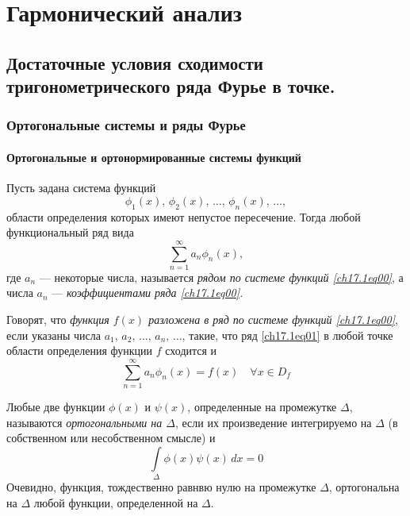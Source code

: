 \part[Гармонический анализ]{Гармонический анализ}%

\chapter{Достаточные условия сходимости тригонометрического ряда Фурье в точке.}
\section{Ортогональные системы и ряды Фурье}
\subsection{Ортогональные и ортонормированные системы функций}
Пусть задана система функций 
\begin{equation} \label{ch17.1eq00}
\phi_1(x), \,\phi_2(x), \, \ldots, \, \phi_n(x), \, \ldots,
\end{equation}
области определения которых имеют непустое пересечение. Тогда любой функциональный ряд вида
\begin{equation} \label{ch17.1eq01}
 \sum_{n = 1}^{\infty} a_n \phi_n(x),
 \end{equation}
 где $a_n$ --- некоторые числа, называется \textit{рядом по системе функций \eqref{ch17.1eq00}}, а числа $a_n$ --- \textit{коэффициентами ряда \eqref{ch17.1eq00}.}
 
 Говорят, что \textit{функция $f(x)$ разложена в ряд по системе функций \eqref{ch17.1eq00}}, если указаны числа $a_1, \,a_2, \,\ldots, \, a_n, \,\ldots$, такие, что ряд \eqref{ch17.1eq01} в любой точке области определения функции $f$ сходится и 
 $$
  \sum_{n = 1}^{\infty} a_n \phi_n(x)=f(x) \quad \forall x \in D_f
  $$ 



\begin{defn}
Любые две функции $\phi(x)$	и $\psi(x)$, определенные на промежутке $\Delta$, называются \textit{ортогональными на $\Delta$}, если их произведение интегрируемо на $\Delta$ (в собственном или несобственном смысле) и
$$
\int \limits_\Delta\phi(x) \psi(x)\,dx=0
$$
Очевидно, функция, тождественно равнвю нулю на промежутке $\Delta$, ортогональна на $\Delta$ любой функции, определенной на $\Delta$.
\end{defn}

